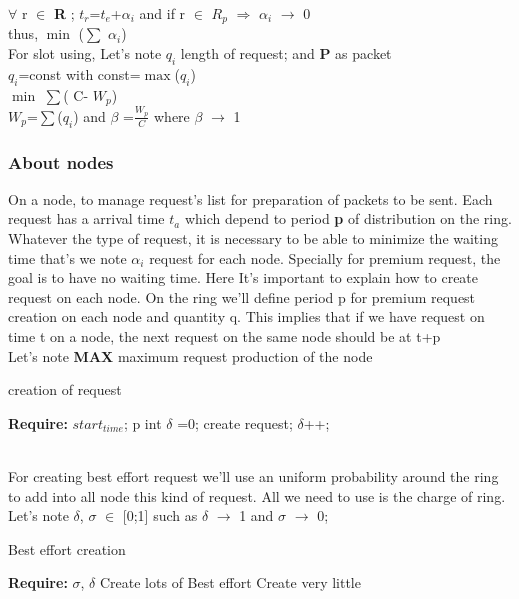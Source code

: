 \documentclass{article}
\begin{document}
$\forall$ r $\in$ \textbf{R} ;  {$t_{r}$}={$t_{e}$}+{$\alpha_{i}$} and  if  r $\in$ {$R_{p}$} $\Rightarrow$ {$\alpha_{i}$} $\rightarrow$ 0\\

thus,   $\min$ ($\sum$ {$\alpha_{i}$})\\

For slot using, Let's note  \textbf{$q_{i}$} length of request; and \textbf{P} as packet\\
{$q_{i}$}=const with const=$\max$({$q_{i}$})\\


     $\min$ $\sum$( C- {$W_{p}$})\\
{$W_{p}$}=$\sum$({$q_{i}$}) and $\beta$ =$ \frac{W_{p}}{C} $  where  $\beta$  $\rightarrow$ 1\\
 	
 
\subsubsection{About nodes} 
On a node, to manage request's list for preparation of packets to be sent. Each request has a arrival time  \textbf{$t_{a}$} which depend to period \textbf{p} of distribution on the ring.\\
 Whatever the type of request, it is necessary to be able to minimize the waiting time that's we note {$\alpha_{i}$} request for each node. Specially for premium request, the goal is to have no waiting time. Here It's important to explain how to create request on each node. On the ring we'll define period p for premium request creation on each node and quantity q. This implies that if we have request on time t on a node, the next request on the same node should be at t+p \\ 
Let's note  \textbf{MAX} maximum request production of the node 
\begin{algorithm}

\caption{creation of request}
\begin{algorithmic}
\State \textbf{Require:}  $start_{time}$; p
\State int $\delta$ =0;
\State create request;
\State $\delta$++;
\EndIf
\EndWhile
\end{algorithmic}
\end{algorithm}  \\

For creating best effort request we'll use an uniform probability around the ring to add into all node this kind of request. All we need to use is the charge of ring.\\
Let's note $\delta$, $\sigma$ $\in$ [0;1] such as $\delta$ $\rightarrow$ 1 and  $\sigma$ $\rightarrow$ 0;
\begin{algorithm}
\caption{Best effort creation}
\begin{algorithmic}
\State \textbf{Require:}  $\sigma$, $\delta$
\State Create lots of Best effort
\Else
\State Create very little 
\EndIf
\end{algorithmic}
\end{algorithm}  
\end{document}
